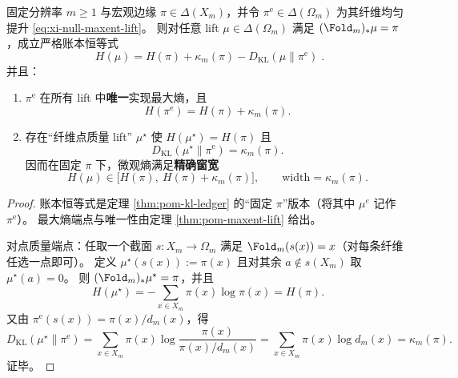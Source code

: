 \begin{theorem}\label{thm:xi-null-fiber-entropy-window}
固定分辨率 \(m\ge 1\) 与宏观边缘 \(\pi\in\Delta(X_m)\)，并令 \(\pi^{\mathrm{e}}\in\Delta(\Omega_m)\) 为其纤维均匀提升 \eqref{eq:xi-null-maxent-lift}。
则对任意 lift \(\mu\in\Delta(\Omega_m)\) 满足 \((\Fold_m)_*\mu=\pi\)，成立严格账本恒等式
\[
\boxed{\;
H(\mu)=H(\pi)+\kappa_m(\pi)-D_{\mathrm{KL}}(\mu\|\pi^{\mathrm{e}})\; }.
\]
并且：
\begin{enumerate}
  \item \(\pi^{\mathrm{e}}\) 在所有 lift 中\textbf{唯一}实现最大熵，且
  \[
  H(\pi^{\mathrm{e}})=H(\pi)+\kappa_m(\pi).
  \]
  \item 存在“纤维点质量 lift” \(\mu^\star\) 使 \(H(\mu^\star)=H(\pi)\) 且
  \[
  D_{\mathrm{KL}}(\mu^\star\|\pi^{\mathrm{e}})=\kappa_m(\pi).
  \]
  因而在固定 \(\pi\) 下，微观熵满足\textbf{精确窗宽}
  \[
  H(\mu)\in\bigl[H(\pi),\ H(\pi)+\kappa_m(\pi)\bigr],
  \qquad
  \mathrm{width}=\kappa_m(\pi).
  \]
\end{enumerate}
\end{theorem}

\begin{proof}
账本恒等式是定理 \ref{thm:pom-kl-ledger} 的“固定 \(\pi\)”版本（将其中 \(\mu^e\) 记作 \(\pi^{\mathrm{e}}\)）。
最大熵端点与唯一性由定理 \ref{thm:pom-maxent-lift} 给出。
\par
对点质量端点：任取一个截面 \(s:X_m\to\Omega_m\) 满足 \(\Fold_m(s(x))=x\)（对每条纤维任选一点即可）。
定义
\(
\mu^\star(s(x)):=\pi(x)
\)
且对其余 \(a\notin s(X_m)\) 取 \(\mu^\star(a)=0\)。
则 \((\Fold_m)_*\mu^\star=\pi\)，并且
\[
H(\mu^\star)=-\sum_{x\in X_m}\pi(x)\log\pi(x)=H(\pi).
\]
又由 \(\pi^{\mathrm{e}}(s(x))=\pi(x)/d_m(x)\)，得
\[
D_{\mathrm{KL}}(\mu^\star\|\pi^{\mathrm{e}})
=\sum_{x\in X_m}\pi(x)\log\frac{\pi(x)}{\pi(x)/d_m(x)}
=\sum_{x\in X_m}\pi(x)\log d_m(x)
=\kappa_m(\pi).
\]
证毕。
\end{proof}

